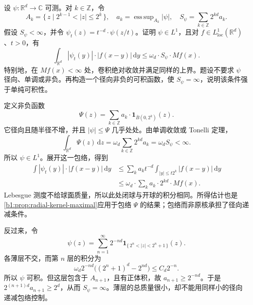 \begin{exercise}\label{b1:ex:13-kernel-envelope}
设 \(\psi:\mathbb R^d\rightarrow\mathbb C\) 可测。对 \(k\in\mathbb Z\)，令
\[
 A_k=\{\,z\mid2^{k-1}<|z|\le2^k\,\},\quad
 a_k=\mathop{\operatorname{ess\,sup}}_{A_k}|\psi|,
 \quad S_\psi=\sum_{k\in\mathbb Z}2^{kd}a_k.
\]
假设 \(S_\psi<\infty\)，并令 \(\psi_t(z)=t^{-d}\cdot \psi(z/t)\)。证明 \(\psi\in L^1\)，且对 \(f\in L^1_{\mathrm{loc}}(\mathbb R^d)\)、\(t>0\)，有
\[
 \int_{\mathbb R^d}|\psi_t(y)|\cdot|f(x-y)|\,\mathrm dy
 \le\omega_d\cdot S_\psi\cdot Mf(x).
\]
特别地，在 \(Mf(x)<\infty\) 处，卷积绝对收敛并满足同样的上界。题设不要求 \(\psi\) 径向、单调或非负。再构造一个径向非负的可积函数，使 \(S_\psi=\infty\)，说明该条件强于单纯可积性。
\end{exercise}
\begin{solution}
定义非负函数
\[
 \Psi(z)=\sum_{k\in\mathbb Z}a_k\cdot\mathbf1_{\overline B(0,2^k)}(z).
\]
它径向且随半径不增，并且 \(|\psi|\le\Psi\) 几乎处处。由单调收敛或 Tonelli 定理，
\[
 \int_{\mathbb R^d}\Psi(z)\,\mathrm dz
 =\omega_d\sum_{k\in\mathbb Z}2^{kd}a_k
 =\omega_dS_\psi<\infty.
\]
所以 \(\psi\in L^1\)。展开这一包络，得到
\begin{align*}
 \int|\psi_t(y)|\cdot|f(x-y)|\,\mathrm dy
 &\le\sum_k a_kt^{-d}\int_{|y|\le t2^k}|f(x-y)|\,\mathrm dy\\
 &\le\omega_d\cdot\sum_k a_k\cdot2^{kd}\cdot Mf(x).
\end{align*}
Lebesgue 测度不给球面质量，所以此处闭球与开球的积分相同。所得估计也是\cref{b1:prop:radial-kernel-maximal}应用于包络 \(\Psi\) 的结果；包络而非原核承担了径向递减条件。

反过来，令
\[
 \psi(z)=\sum_{n=1}^{\infty}2^{-nd}
 \mathbf1_{\{\,2^n<|z|<2^n+1\,\}}(z).
\]
各薄层不交，而第 \(n\) 层的积分为
\[
 \omega_d2^{-nd}\bigl((2^n+1)^d-2^{nd}\bigr)
 \le C_d2^{-n}.
\]
所以 \(\psi\) 可积。但这层包含于 \(A_{n+1}\)，且有正体积，故 \(a_{n+1}\ge2^{-nd}\)。于是 \(2^{(n+1)d}a_{n+1}\ge2^d\)，从而 \(S_\psi=\infty\)。薄层的总质量很小，却不能用同样小的径向递减包络控制。
\end{solution}

